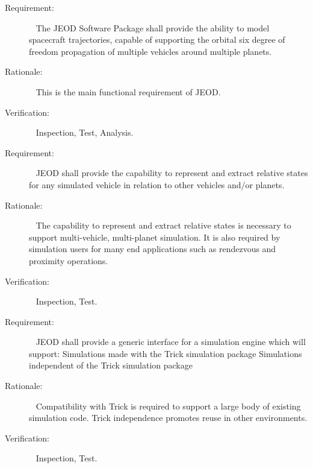 \label{reqt:main_function}
\begin{description}
  \item[Requirement:]\ \newline
  The JEOD Software Package shall provide the ability to model spacecraft trajectories, capable of supporting the orbital six degree of freedom propagation of multiple vehicles around multiple planets.
  \item[Rationale:]\ \newline
  This is the main functional requirement of JEOD.
  \item[Verification:]\ \newline
  Inspection, Test, Analysis.
\end{description}

\label{reqt:rel_states}
\begin{description}
  \item[Requirement:]\ \newline
  JEOD shall provide the capability to represent and extract relative states for any simulated vehicle in relation to other vehicles and/or planets.
  \item[Rationale:]\ \newline
  The capability to represent and extract relative states is necessary to support multi-vehicle, multi-planet simulation.  It is also required by simulation users for many end applications such as rendezvous and proximity operations.
  \item[Verification:]\ \newline
 Inspection, Test.
\end{description}

\label{reqt:sim_interface}
\begin{description}
 \item[Requirement:]\ \newline
JEOD shall provide  a generic interface for a simulation engine which will support:
\subrequirement {}
\label {reqt:trick}
Simulations made with the Trick simulation package
\subrequirement {}
\label {reqt:nontrick}
Simulations independent of the Trick simulation package
  \item[Rationale:]\ \newline
Compatibility with Trick is required to support a large body of existing simulation code.  Trick independence promotes reuse in other environments.

  \item[Verification:]\ \newline
    Inspection, Test.
\end{description}
